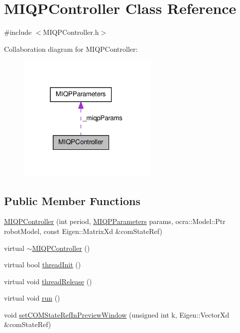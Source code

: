 \hypertarget{classMIQPController}{\section{\-M\-I\-Q\-P\-Controller \-Class \-Reference}
\label{classMIQPController}
}


{\ttfamily \#include $<$\-M\-I\-Q\-P\-Controller.\-h$>$}



\-Collaboration diagram for \-M\-I\-Q\-P\-Controller\-:\nopagebreak
\begin{figure}[H]
\begin{center}
\leavevmode
\includegraphics[width=190pt]{classMIQPController__coll__graph}
\end{center}
\end{figure}
\subsection*{\-Public \-Member \-Functions}
\begin{DoxyCompactItemize}
\item 
\hyperlink{classMIQPController_a73b26ce1edd4ab839826abedcc72a475}{\-M\-I\-Q\-P\-Controller} (int period, \hyperlink{structMIQPParameters}{\-M\-I\-Q\-P\-Parameters} params, ocra\-::\-Model\-::\-Ptr robot\-Model, const \-Eigen\-::\-Matrix\-Xd \&com\-State\-Ref)
\item 
virtual \hyperlink{classMIQPController_a46e1cc8dba1633a49d934aa20730e358}{$\sim$\-M\-I\-Q\-P\-Controller} ()
\item 
virtual bool \hyperlink{classMIQPController_a7e82a26dc823c7f69d00997d0ca98052}{thread\-Init} ()
\item 
virtual void \hyperlink{classMIQPController_a43faa045ed47859b04f39e99805888c1}{thread\-Release} ()
\item 
virtual void \hyperlink{classMIQPController_aa8fd8452a14d8e7731bf45044e1c7a59}{run} ()
\item 
void \hyperlink{classMIQPController_a69b193f0aab0fa0d0ec439b4d1b2a65f}{set\-C\-O\-M\-State\-Ref\-In\-Preview\-Window} (unsigned int k, \-Eigen\-::\-Vector\-Xd \&com\-State\-Ref)
\end{DoxyCompactItemize}
